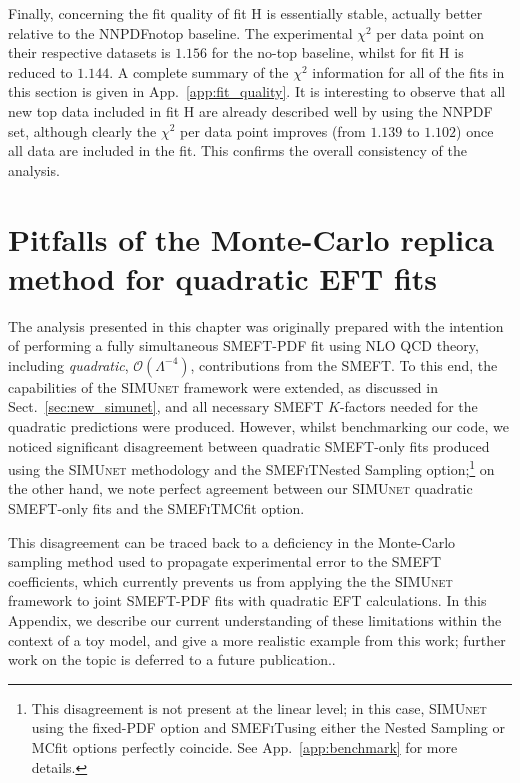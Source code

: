 \documentclass[withindex,glossary]{cam-thesis}
\newcommand{\simunet}{\textsc{SIMUnet}}
\newcommand{\smefit}{\textsc{SMEFiT}}
\begin{document}
Finally, concerning the fit quality of fit H is essentially stable, actually 
better relative to the NNPDFnotop baseline. The experimental $\chi^2$ per data point on
their respective datasets is $1.156$ for the no-top baseline, whilst for
fit H is reduced to $1.144$. A complete summary of the $\chi^2$ information
for all of the fits in this section is given in App.~\ref{app:fit_quality}.
It is interesting to observe that all new top data included in fit H are
already described well by using the NNPDF set, although clearly the $\chi^2$
per data point improves (from $1.139$ to $1.102$) once all data are included
in the fit. This confirms the overall consistency of the analysis. 


\section{Pitfalls of the Monte-Carlo replica method for quadratic EFT fits}
\label{sec:quad}

The analysis presented in this chapter was originally prepared with the intention of performing a fully simultaneous SMEFT-PDF
fit using NLO QCD theory, including \textit{quadratic}, $\mathcal{O}\left( \Lambda^{-4}\right)$, contributions from the SMEFT.
To this end, the capabilities of the \simunet{} framework were extended, as discussed in Sect.~\ref{sec:new_simunet}, and
all necessary SMEFT $K$-factors needed for the quadratic predictions were produced.
%
However, whilst benchmarking our code, we noticed significant disagreement between quadratic SMEFT-only fits
produced using the \simunet{} methodology and the \smefit Nested Sampling option;\footnote{This disagreement is not present at the linear level; in this case, \simunet{} using the fixed-PDF option and \smefit using either the Nested Sampling or MCfit options perfectly coincide. See App.~\ref{app:benchmark} for more details.} on the other hand, we note perfect agreement
between our \simunet{} quadratic SMEFT-only fits and the \smefit MCfit option.

This disagreement can be traced back to 
a deficiency in the Monte-Carlo sampling method used to propagate experimental error to the SMEFT coefficients, which
currently prevents us from applying the
the \simunet{} framework to joint SMEFT-PDF
fits with quadratic EFT calculations. 
%
In this Appendix, we describe our current understanding of these limitations within the context of a toy model, 
and give a more realistic example from this work; further work on the topic is deferred to a future publication..
\end{document}
